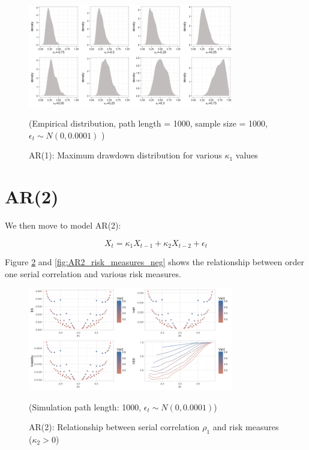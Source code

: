 \documentclass[11pt]{article}
\begin{document}
\begin{figure}[H]
\centering
\includegraphics[width = 0.8\textwidth]{../figures/simulation/AR1_maxDrawdown_dist}
\caption{AR(1): Maximum drawdown distribution for various $\kappa_1$ values }
(Empirical distribution, path length = 1000, sample size = 1000, $\epsilon_t \sim N(0, 0.0001)$ )
\label{fig:AR1_maxDrawdown_dist}
\end{figure}

\section{AR(2)} %

We then move to model AR(2):

\begin{equation}
X_t = \kappa_1X_{t-1} + \kappa_2X_{t-2}  + \epsilon_t
\end{equation}

Figure \ref{fig:AR2_risk_measures_pos} and \ref{fig:AR2_risk_measures_neg} shows the relationship between order one serial correlation and various risk measures.

\begin{figure}[H]
\centering
\includegraphics[width = 0.8\textwidth]{../figures/simulation/AR2_risk_measures_pos}
\caption{AR(2): Relationship between serial correlation $\rho_1$ and risk measures ($\kappa_2 > 0$)}
(Simulation path length: 1000, $\epsilon_t \sim N(0, 0.0001)$)
\label{fig:AR2_risk_measures_pos}
\end{figure}
\end{document}
